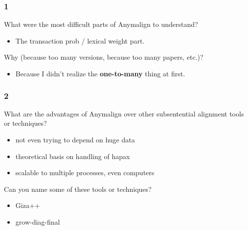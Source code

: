 \begin{frame}\frametitle{1}

\begin{block}{What were the most difficult parts of Anymalign to
  understand?}

  \begin{itemize} \itemsep1pt\parskip0pt
  \item
  The transaction prob / lexical weight part.
  \end{itemize}

  \end{block}

  \begin{block}{Why (because too many versions, because too many papers,
      etc.)?}

  \begin{itemize} \itemsep1pt\parskip0pt
  \item
  Because I didn't realize the \textbf{one-to-many} thing at first.
  \end{itemize}

  \end{block}

  \end{frame}

  \begin{frame}\frametitle{2}

  \begin{block}{What are the advantages of Anymalign over other
    subsentential alignment tools or techniques?}

    \begin{itemize}
    \item
    not even trying to depend on huge data
    \item
    theoretical basis on handling of hapax
    \item
    scalable to multiple processes, even computers
    \end{itemize}

    \end{block}

    \begin{block}{Can you name some of these tools or techniques?}

    \begin{itemize} \itemsep1pt\parskip0pt
    \item
    Giza++
    \item
    grow-diag-final
    \end{itemize}

    \end{block}

    \end{frame}

